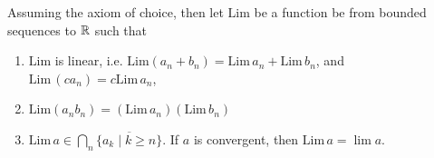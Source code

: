 \begin{simplethm}
    Assuming the axiom of choice, then let $\mathrm{Lim}$ be a function be from bounded sequences to $\mathbb R$ such that
    \begin{enumerate}[label=(\roman*)]
        \item $\mathrm{Lim}$ is linear, i.e. $\mathrm{Lim}(a_n + b_n) = \mathrm{Lim} \, a_n + \mathrm{Lim} \, b_n$, and $\mathrm{Lim} \, (ca_n) = c \mathrm{Lim} \, a_n$, 
        \item $\mathrm{Lim} (a_n b_n) = (\mathrm{Lim} \, a_n)(\mathrm{Lim} \, b_n)$
        \item $\mathrm{Lim} \, a \in \bigcap_n \overline{\{a_k \mid k \geq n\}}$. If $a$ is convergent, then $\mathrm{Lim} \, a = \lim a$.
    \end{enumerate}
\end{simplethm}